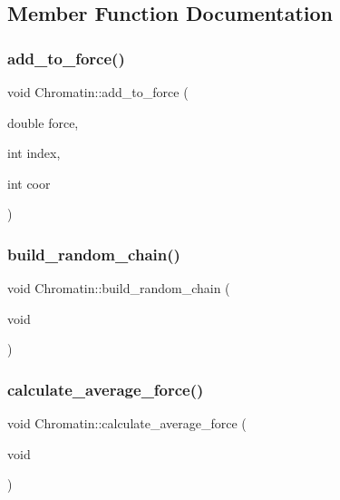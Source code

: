 \subsection{Member Function Documentation}
\mbox{\label{classChromatin_a5bc9c714d620b6cd1f3b3a6d85dbd1d8}} 
\subsubsection{\texorpdfstring{add\_to\_force()}{add\_to\_force()}}
{\footnotesize\ttfamily void Chromatin\+::add\+\_\+to\+\_\+force (\begin{DoxyParamCaption}\item[{double}]{force,  }\item[{int}]{index,  }\item[{int}]{coor }\end{DoxyParamCaption})\hspace{0.3cm}{\ttfamily [inline]}}

\mbox{\label{classChromatin_ae3f17fd0b51db84a3890105f8f4a7028}} 
\subsubsection{\texorpdfstring{build\_random\_chain()}{build\_random\_chain()}}
{\footnotesize\ttfamily void Chromatin\+::build\+\_\+random\+\_\+chain (\begin{DoxyParamCaption}\item[{void}]{ }\end{DoxyParamCaption})}

\mbox{\label{classChromatin_aa3e429b42938181fcd2fa156468c4b29}} 
\subsubsection{\texorpdfstring{calculate\_average\_force()}{calculate\_average\_force()}}
{\footnotesize\ttfamily void Chromatin\+::calculate\+\_\+average\+\_\+force (\begin{DoxyParamCaption}\item[{void}]{ }\end{DoxyParamCaption})\hspace{0.3cm}{\ttfamily [inline]}}

